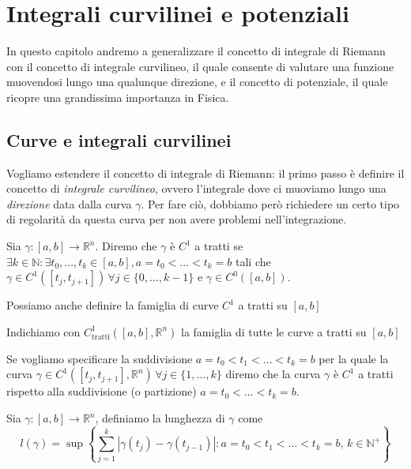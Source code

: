 \chapter{Integrali curvilinei e potenziali}
\pagestyle{plain}
\thispagestyle{empty}
\pagestyle{fancy}
In questo capitolo andremo a generalizzare il concetto di integrale di Riemann con il concetto di integrale curvilineo, il quale consente di valutare una funzione muovendosi lungo una qualunque direzione, e il concetto di potenziale, il quale ricopre una grandissima importanza in Fisica.
\label{cap:integrali_curvilinei}

\section{Curve e integrali curvilinei}

Vogliamo estendere il concetto di integrale di Riemann: il primo passo è definire il concetto di \emph{integrale curvilineo}, ovvero l'integrale dove ci muoviamo lungo una \emph{direzione} data dalla curva $\gamma$. Per fare ciò, dobbiamo però richiedere un certo tipo di regolarità da questa curva per non avere problemi nell'integrazione.
\begin{definition}
	Sia $\gamma: [a, b] \to \mathbb{R}^n$. Diremo che $\gamma$ è $C^1$ a tratti se $\exists k \in \mathbb{N} : \exists t_0, \ldots, t_k \in [a, b], a = t_0 < \ldots < t_k = b$ tali che $\gamma \in C^1([t_{j}, t_{j+1}]) \, \forall j \in \{0, \ldots, k-1 \}$ e $\gamma \in C^0([a, b])$.
\end{definition}
Possiamo anche definire la famiglia di curve $C^1$ a tratti su $[a,b]$
\begin{definition}
	Indichiamo con $C^1_{\text{tratti}}([a, b], \mathbb{R}^n)$ la famiglia di tutte le curve a tratti su $[a, b]$
\end{definition}
Se vogliamo specificare la suddivisione $a=t_0 < t_1 < \ldots < t_k = b$ per la quale la curva $\gamma \in C^1([t_j, t_{j+1}], \mathbb{R}^n) \, \forall j \in \{1, \ldots, k \}$ 
diremo che la curva $\gamma$ è $C^1$ a tratti rispetto alla suddivisione (o partizione) $a = t_0 < \ldots < t_k = b$. \\
\begin{definition} 
	Sia $\gamma : [a,b] \to \mathbb{R}^n$, definiamo la lunghezza di $\gamma$ come
	$$
		\mathit{l}(\gamma) = \sup \left\{ \sum_{j=1}^k |\gamma(t_j)-\gamma(t_{j-1})| : a = t_0 < t_1 < \ldots < t_k = b, \, k \in \mathbb{N}^+ \right\}
	$$
\end{definition}
